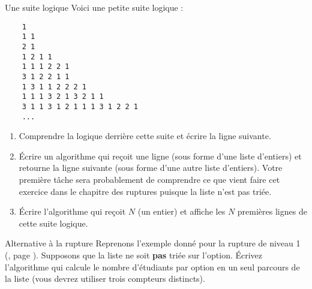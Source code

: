 \begin{Exercice}{Une suite logique}
	Voici une petite suite logique :
	
	\begin{minipage}{5cm}
		\small
		\begin{verbatim}
	1
	1 1
	2 1
	1 2 1 1
	1 1 1 2 2 1
	3 1 2 2 1 1
	1 3 1 1 2 2 2 1
	1 1 1 3 2 1 3 2 1 1
	3 1 1 3 1 2 1 1 1 3 1 2 2 1
	...
		\end{verbatim}
	\end{minipage}
	\begin{minipage}{9cm}
		\begin{enumerate}[label=\alph*)]
		\item
			Comprendre la logique derrière cette suite 
			et écrire la ligne suivante.
		\item
			Écrire un algorithme qui reçoit une ligne 
			(sous forme d'une liste d'entiers) 
			et retourne la ligne suivante 
			(sous forme d'une autre liste d'entiers).
			Votre première tâche sera probablement de comprendre 
			ce que vient faire cet exercice dans le chapitre des ruptures puisque la liste n'est pas triée.
		\item
			Écrire l'algorithme qui reçoit $N$ (un entier) 
			et affiche les $N$ premières lignes de cette suite logique.	
		\end{enumerate}
	\end{minipage}
\end{Exercice}

\begin{Exercice}{Alternative à la rupture}
	Reprenons l'exemple donné pour la rupture de niveau 1 (, page \pageref{algo:rupt1}).
	Supposons que la liste ne soit \textbf{pas} triée sur l'option.
	Écrivez l'algorithme qui calcule le nombre d'étudiants par option en un seul parcours de la liste
	(vous devrez utiliser trois compteurs distincts).
\end{Exercice}

